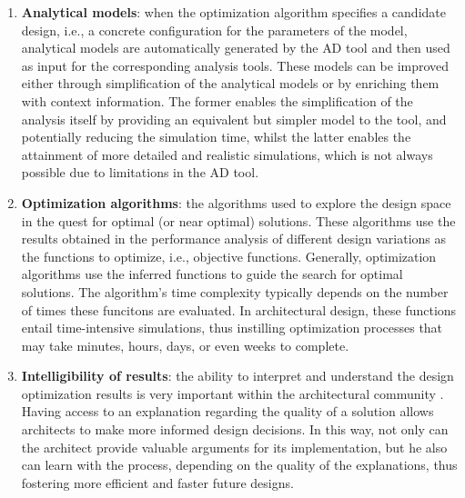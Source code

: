 \begin{enumerate}
\item \textbf{Analytical models}: when the optimization algorithm specifies a candidate design, i.e., a concrete configuration for the parameters of the model, analytical models are automatically generated by the \ac{AD} tool and then used as input for the corresponding analysis tools. These models can be improved either through simplification of the analytical models or by enriching them with context information. The former enables the simplification of the analysis itself by providing an equivalent but simpler model to the tool, and potentially reducing the simulation time, whilst the latter enables the attainment of more detailed and realistic simulations, which is not always possible due to limitations in the \ac{AD} tool. 

\item \textbf{Optimization algorithms}: the algorithms used to explore the design space in the quest for optimal (or near optimal) solutions. These algorithms use the results obtained in the performance analysis of different design variations as the functions to optimize, i.e., objective functions. Generally, optimization algorithms use the inferred functions to guide the search for optimal solutions. The algorithm's time complexity typically depends on the number of times these funcitons are evaluated. In architectural design, these functions entail time-intensive simulations, thus instilling optimization processes that may take minutes, hours, days, or even weeks to complete.

\item \textbf{Intelligibility of results}: the ability to interpret and understand the design optimization results is very important within the architectural community \cite{Shi2016,Cichocka2017SURVEY}. Having access to an explanation regarding the quality of a solution allows architects to make more informed design decisions. In this way, not only can the architect provide valuable arguments for its implementation, but he also can learn with the process, depending on the quality of the explanations, thus fostering more efficient and faster future designs. 


\end{enumerate}
